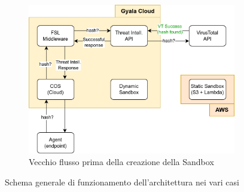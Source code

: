 \begin{figure}
    \hfill
    \vspace{0.5cm}
    \hfill
    \begin{subfigure}[b]{0.48\textwidth}
        \centering
        \includegraphics[width=\textwidth]{assets/fsl_general_arch_vt_success.png}
        \caption{Vecchio flusso prima della creazione della Sandbox}
        \label{fig:fsl_general_arch_vt_success}
    \end{subfigure}
    \caption{Schema generale di funzionamento dell'architettura nei vari casi}
    \label{fig:fsl_general_arch}
\end{figure}